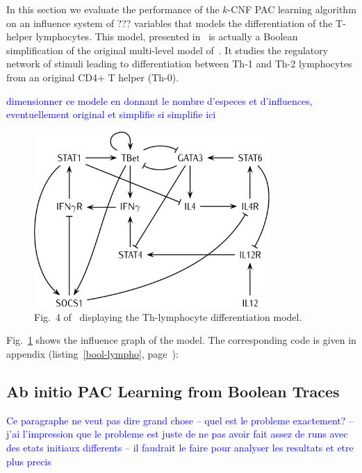 \documentclass{llncs}
\newcommand{\francois}[1]{\textcolor{blue}{#1}}
\begin{document}
In this section we evaluate the performance of the $k$-CNF PAC learning  algorithm 
on an influence system of ??? variables that models the differentiation of the
T-helper lymphocytes.
   This model, presented in~\cite{RRMTC06tcsb} is actually a Boolean
   simplification of the original multi-level model
   of~\cite{Mendoza06biosystems}. It studies the regulatory network of stimuli
   leading to differentiation between Th-1 and Th-2 lymphocytes from an
   original CD4+ T helper (Th-0).

\francois{dimensionner ce modele en donnant le nombre d'especes et d'influences, eventuellement original et simplifie si simplifie ici}

   \begin{figure}[htbp]
   	\centering
      \includegraphics[width=0.8\textwidth]{th_net_clean.png}
      \caption{Fig.~4 of~\cite{RRMTC06tcsb} displaying the Th-lymphocyte
      differentiation model.\label{fig:lympho}}
   \end{figure}

   Fig.~\ref{fig:lympho} shows the influence graph of the model. The
   corresponding code is given in appendix (listing~\ref{bool-lympho}, page~\pageref{bool-lympho}):

\subsection{Ab initio PAC Learning from Boolean Traces}

\francois{Ce paragraphe ne veut pas dire grand chose --
quel est le probleme exactement?
-- j'ai l'impression que le probleme est juste de ne pas avoir fait assez de runs avec des etats initiaux differents
-- il faudrait le faire pour analyser les resultats et etre plus precis}
\end{document}
